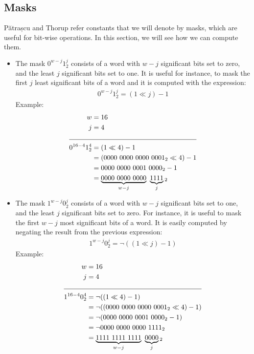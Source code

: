 \subsection{Masks} \label{sec:masks}

Pătrașcu and Thorup refer constants that we will denote by masks, which are useful for bit-wise operations. In this section, we will see how we can compute them.

\begin{itemize}
    \item
    The mask $0^{w-j} 1^j_2$ consists of a word with $w-j$ significant bits set to zero, and the least $j$ significant bits set to one. It is useful for instance, to mask the first $j$ least significant bits of a word and it is computed with the expression:
    \begin{align*}
        0^{w-j} 1^j_2 = (1 \ll j) - 1
    \end{align*}
    Example:
    \begin{align*}
        w &= 16\\
        j &= 4\\
        \cline{1-2}
        0^{16-4} 1^4_2 &= (1 \ll 4) - 1\\
        &= (0000\ 0000\ 0000\ 0001_2 \ll 4) - 1\\
        &= 0000\ 0000\ 0001\ 0000_2 - 1\\
        &= \underbrace{0000\ 0000\ 0000}_{w-j}\ \underbrace{1111}_{j}{}_2
    \end{align*}
    
    \item
    The mask $1^{w-j} 0^j_2$ consists of a word with $w-j$ significant bits set to one, and the least $j$ significant bits set to zero. For instance, it is useful to mask the first $w - j$ most significant bits of a word. It is easily computed by negating the result from the previous expression:
    \begin{align*}
        1^{w-j} 0^j_2= \neg((1 \ll j) - 1)
    \end{align*}
    Example:
    \begin{align*}
        w &= 16\\
        j &= 4\\
        \cline{1-2}
        1^{16-4} 0^4_2 &= \neg((1 \ll 4) - 1)\\
        &= \neg((0000\ 0000\ 0000\ 0001_2 \ll 4) - 1)\\
        &= \neg(0000\ 0000\ 0001\ 0000_2 - 1)\\
        &= \neg0000\ 0000\ 0000\ 1111_2\\
        &= \underbrace{1111\ 1111\ 1111}_{w-j}\ \underbrace{0000}_{j}{}_2
    \end{align*}
\end{itemize}


